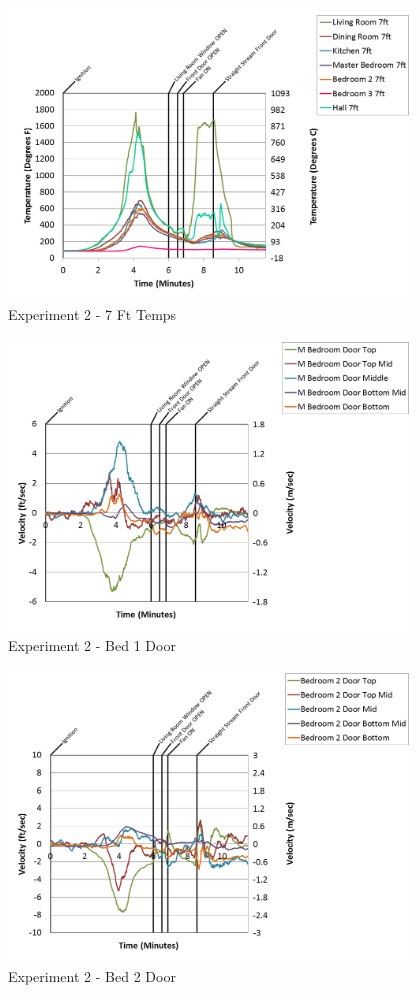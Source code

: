 \documentclass{article}
\begin{document}
\begin{appendices}
\begin{figure}[h!]
	\centering
	\includegraphics[height=3.05in]{0_Images/Results_Charts/Exp_2_Charts/7FtTemps.png}
	\caption{Experiment 2 - 7 Ft Temps}
\end{figure}

\clearpage

\begin{figure}[h!]
	\centering
	\includegraphics[height=3.05in]{0_Images/Results_Charts/Exp_2_Charts/Bed1Door.png}
	\caption{Experiment 2 - Bed 1 Door}
\end{figure}


\begin{figure}[h!]
	\centering
	\includegraphics[height=3.05in]{0_Images/Results_Charts/Exp_2_Charts/Bed2Door.png}
	\caption{Experiment 2 - Bed 2 Door}
\end{figure}


\end{appendices}
\end{document}
